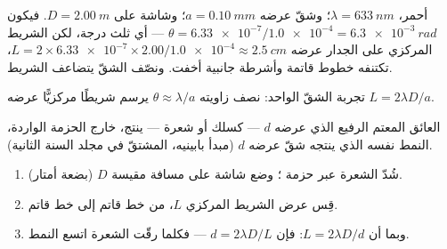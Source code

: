 \begin{example}\label{ex:g12:light-as-wave:slit}
 أحمر، $\lambda = \qty{633}{nm}$؛ وشقّ عرضه $a = \qty{0.10}{mm}$؛
وشاشة على $D = \qty{2.00}{m}$. فيكون $\theta = \num{6.33e-7} /
\num{1.0e-4} = \qty{6.3e-3}{rad}$ --- أي ثلث درجة، لكن
الشريط المركزي على الجدار عرضه $L = 2 \times \num{6.33e-7} \times 2.00 /
\num{1.0e-4} \approx \qty{2.5}{cm}$، تكتنفه خطوط قاتمة
وأشرطة جانبية أخفت. ونصّف الشقّ يتضاعف الشريط.
\end{example}

\begin{omfigure}

{\small تجربة الشقّ الواحد:  نصف زاويته $\theta
\approx \lambda/a$ يرسم شريطًا مركزيًّا عرضه $L = 2\lambda D/a$.}
\end{omfigure}

\begin{proposition}\label{prop:g12:light-as-wave:hair}
العائق المعتم الرفيع الذي عرضه $d$ --- كسلك أو شعرة --- ينتج،
خارج الحزمة الواردة، النمط نفسه الذي ينتجه شقّ عرضه $d$
(مبدأ بابينيه، المشتقّ في مجلد السنة الثانية).
\end{proposition}
\admitted

\begin{method}\label{met:g12:light-as-wave:hairwidth}
\begin{enumerate}
  \item شُدّ الشعرة عبر حزمة ؛ وضع شاشة على مسافة
        مقيسة $D$ (بضعة أمتار).
  \item قِس عرض الشريط المركزي $L$، من خط قاتم إلى خط قاتم.
  \item وبما أن $L = 2\lambda D/d$: فإن $d = 2\lambda D/L$ --- فكلما رقّت الشعرة
        اتسع النمط.
\end{enumerate}
\end{method}

